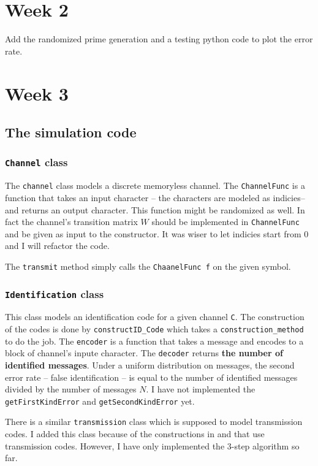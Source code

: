 \documentclass{article}
\begin{document}
\section{Week 2}
Add the randomized prime generation and a testing python code to plot the error rate.
\section{Week 3}
\subsection{The simulation code}
\subsubsection{\texttt{Channel} class}

The \texttt{channel} class models a discrete memoryless channel.  The \texttt{ChannelFunc} is a function that takes an input character -- the characters are modeled as indicies-- and returns an output character. This function might be randomized as well. In fact the channel's transition matrix \(W\) should be implemented in \texttt{ChannelFunc} and be given as input to the constructor. It was wiser to let indicies start from \(0\) and I will refactor the code.

The \texttt{transmit} method simply calls the \texttt{ChaanelFunc f} on the given symbol.

\subsubsection{\texttt{Identification} class}

This class models an identification code for a given channel \texttt{C}. The construction of the codes is done by \texttt{constructID\_Code} which takes a \texttt{construction\_method} to do the job. The \texttt{encoder} is a function that takes a message and encodes to a block of channel's inpute character.  The \texttt{decoder} returns \textbf{the number of identified messages}. Under a uniform distribution on messages, the second error rate -- false identification -- is equal to the number of identified messages divided by the number of messages \(N\). I have not implemented the \texttt{getFirstKindError} and \texttt{getSecondKindError} yet.

There is a similar \texttt{transmission} class which is supposed to model transmission codes. I added this class because of the constructions in \cite{idfeedback} and \cite{verdu} that use transmission codes. However, I have only implemented the 3-step algorithm so far.
\end{document}
